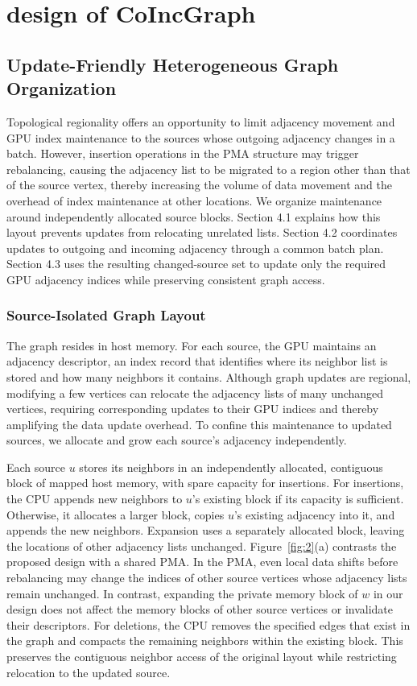 \section{design of CoIncGraph}
\label{sec:design}

\subsection{Update-Friendly Heterogeneous Graph Organization}
\label{sec:graph-organization}


Topological regionality offers an opportunity to limit adjacency movement and GPU index maintenance to the sources whose outgoing adjacency changes in a batch. However, insertion operations in the PMA structure may trigger rebalancing, causing the adjacency list to be migrated to a region other than that of the source vertex, thereby increasing the volume of data movement and the overhead of index maintenance at other locations. We organize maintenance around independently allocated source blocks. Section 4.1 explains how this layout prevents updates from relocating unrelated lists. Section 4.2 coordinates updates to outgoing and incoming adjacency through a common batch plan. Section 4.3 uses the resulting changed-source set to update only the required GPU adjacency indices while preserving consistent graph access.

\subsubsection{Source-Isolated Graph Layout}
\label{sec:source-layout}


The graph resides in host memory. For each source, the GPU maintains an adjacency descriptor, an index record that identifies where its neighbor list is stored and how many neighbors it contains. Although graph updates are regional, modifying a few vertices can relocate the adjacency lists of many unchanged vertices, requiring corresponding updates to their GPU indices and thereby amplifying the data update overhead. To confine this maintenance to updated sources, we allocate and grow each source's adjacency independently.

Each source $u$ stores its neighbors in an independently allocated, contiguous block of mapped host memory, with spare capacity for insertions. For insertions, the CPU appends new neighbors to $u$'s existing block if its capacity is sufficient. Otherwise, it allocates a larger block, copies $u$'s existing adjacency into it, and appends the new neighbors. Expansion uses a separately allocated block, leaving the locations of other adjacency lists unchanged. Figure~\ref{fig:2}(a) contrasts the proposed design with a shared PMA. In the PMA, even local data shifts before rebalancing may change the indices of other source vertices whose adjacency lists remain unchanged. In contrast, expanding the private memory block of $w$ in our design does not affect the memory blocks of other source vertices or invalidate their descriptors. For deletions, the CPU removes the specified edges that exist in the graph and compacts the remaining neighbors within the existing block. This preserves the contiguous neighbor access of the original layout while restricting relocation to the updated source.


